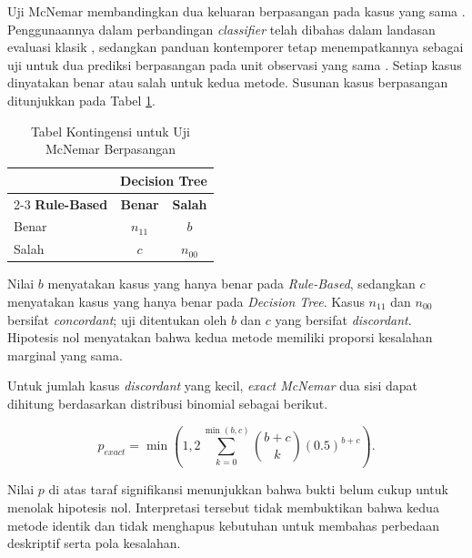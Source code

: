 Uji McNemar membandingkan dua keluaran berpasangan pada kasus yang sama \cite{McNemar1947}. Penggunaannya dalam perbandingan \textit{classifier} telah dibahas dalam landasan evaluasi klasik \cite{Dietterich1998}, sedangkan panduan kontemporer tetap menempatkannya sebagai uji untuk dua prediksi berpasangan pada unit observasi yang sama \cite{RainioEtAl2024}. Setiap kasus dinyatakan benar atau salah untuk kedua metode. Susunan kasus berpasangan ditunjukkan pada Tabel \ref{tab:mcnemar-berpasangan}.

\begin{table}[htbp]
    \centering
    \caption{Tabel Kontingensi untuk Uji McNemar Berpasangan}
    \label{tab:mcnemar-berpasangan}
    \renewcommand{\arraystretch}{1.2}
    \begin{tabular}{lcc}
        \toprule
        & \multicolumn{2}{c}{\textbf{Decision Tree}} \\
        \cmidrule(lr){2-3}
        \textbf{Rule-Based} & \textbf{Benar} & \textbf{Salah} \\
        \midrule
        Benar & $n_{11}$ & $b$ \\
        Salah & $c$ & $n_{00}$ \\
        \bottomrule
    \end{tabular}
\end{table}

Nilai $b$ menyatakan kasus yang hanya benar pada \textit{Rule-Based}, sedangkan $c$ menyatakan kasus yang hanya benar pada \textit{Decision Tree}. Kasus $n_{11}$ dan $n_{00}$ bersifat \textit{concordant}; uji ditentukan oleh $b$ dan $c$ yang bersifat \textit{discordant}. Hipotesis nol menyatakan bahwa kedua metode memiliki proporsi kesalahan marginal yang sama.

Untuk jumlah kasus \textit{discordant} yang kecil, \textit{exact McNemar} dua sisi dapat dihitung berdasarkan distribusi binomial sebagai berikut.

\begin{equation}
p_{exact}=\min\left(1,2\sum_{k=0}^{\min(b,c)}\binom{b+c}{k}(0.5)^{b+c}\right).
\label{eq:exact-mcnemar}
\end{equation}

Nilai $p$ di atas taraf signifikansi menunjukkan bahwa bukti belum cukup untuk menolak hipotesis nol. Interpretasi tersebut tidak membuktikan bahwa kedua metode identik dan tidak menghapus kebutuhan untuk membahas perbedaan deskriptif serta pola kesalahan.

\FloatBarrier

